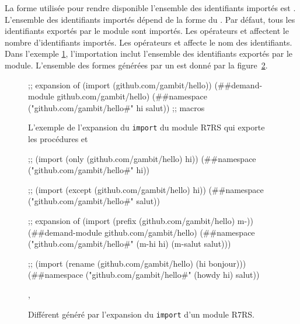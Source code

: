 La forme utilisée pour rendre disponible l'ensemble des identifiants importés
est . L'ensemble des identifiants importés dépend de la
forme du . Par défaut, tous les identifiants exportés par le
module sont importés.  Les opérateurs  et 
affectent le nombre d'identifiants importés. Les opérateurs  et
 affecte le nom des identifiants.  Dans l'exemple
\ref{fig:import->expand-r7rs}, l'importation inclut l'ensemble des identifiants
exportés par le module. L'ensemble des formes  générées par
un  est donné par la
figure~\ref{fig:import->expand-r7rs-namespace}.
\\

\begin{figure}[ht]
  \centering
  \begin{mplisting}{1}
;; expansion of (import (github.com/gambit/hello))
(##demand-module github.com/gambit/hello)
(##namespace ("github.com/gambit/hello#" hi salut))
;; macros
\end{mplisting}
  \caption{L'exemple de l'expansion du \texttt{import} du module R7RS
     qui exporte les procédures
     et }
  \label{fig:import->expand-r7rs}
\end{figure}


\begin{figure}[ht]
  \centering
  \begin{mplisting}{1}
;; (import (only (github.com/gambit/hello) hi))
(##namespace ("github.com/gambit/hello#" hi))

;; (import (except (github.com/gambit/hello) hi))
(##namespace ("github.com/gambit/hello#" salut))

;; expansion of (import (prefix (github.com/gambit/hello) m-))
(##demand-module github.com/gambit/hello)
(##namespace ("github.com/gambit/hello#" (m-hi hi) (m-salut salut)))

;; (import (rename (github.com/gambit/hello) (hi bonjour)))
(##namespace ("github.com/gambit/hello#" (howdy hi) salut))
\end{mplisting}
  \caption{Différent  généré par
    l'expansion du \texttt{import} d'un module R7RS.}
  \label{fig:import->expand-r7rs-namespace},
\end{figure}


